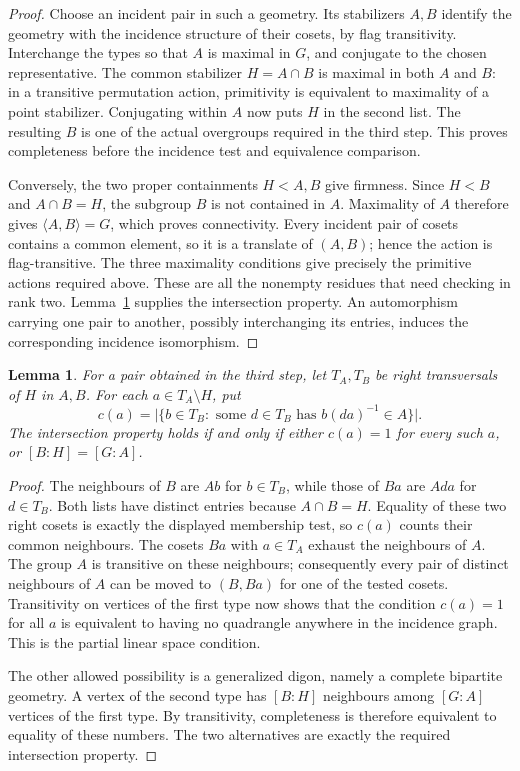 \documentclass[11pt]{article}
\newtheorem{lemma}[theorem]{Lemma}
\begin{document}
\begin{proof}
Choose an incident pair in such a geometry. Its stabilizers $A,B$ identify
the geometry with the incidence structure of their cosets, by flag
transitivity. Interchange the types so that $A$ is maximal in $G$, and
conjugate to the chosen representative. The common stabilizer $H=A\cap B$
is maximal in both $A$ and $B$: in a transitive permutation action,
primitivity is equivalent to maximality of a point stabilizer. Conjugating
within $A$ now puts $H$ in the second list. The resulting $B$ is one of
the actual overgroups required in the third step. This proves completeness
before the incidence test and equivalence comparison.

Conversely, the two proper containments $H<A,B$ give firmness. Since
$H<B$ and $A\cap B=H$, the subgroup $B$ is not contained in $A$.
Maximality of $A$ therefore gives $\langle A,B\rangle=G$, which proves
connectivity. Every incident pair of cosets contains a common element,
so it is a translate of $(A,B)$; hence the action is flag-transitive.
The three maximality conditions give precisely the primitive actions
required above. These are all the nonempty residues that need checking
in rank two. Lemma~\ref{l:allpairs} supplies the intersection property.
An automorphism carrying one pair to another, possibly interchanging
its entries, induces the corresponding incidence isomorphism.
\end{proof}

\begin{lemma}\label{l:allpairs}
For a pair obtained in the third step, let $T_A,T_B$ be right transversals
of $H$ in $A,B$. For each $a\in T_A\setminus H$, put
\[
 c(a)=\bigl|\{b\in T_B:\text{ some }d\in T_B
                              \text{ has }b(da)^{-1}\in A\}\bigr|.
\]
The intersection property holds if and only if either $c(a)=1$ for every
such $a$, or \mbox{$[B:H]=[G:A]$}.
\end{lemma}
\begin{proof}
The neighbours of $B$ are $Ab$ for $b\in T_B$, while those of $Ba$ are
$Ada$ for $d\in T_B$. Both lists have distinct entries because
$A\cap B=H$. Equality of these two right cosets is exactly the displayed
membership test, so $c(a)$ counts their common neighbours. The cosets
$Ba$ with $a\in T_A$ exhaust the neighbours of $A$. The group $A$ is
transitive on these neighbours; consequently every pair of distinct
neighbours of $A$ can be moved to $(B,Ba)$ for one of the tested cosets.
Transitivity on vertices of the first type now shows that the condition
$c(a)=1$ for all $a$ is equivalent to having no quadrangle anywhere in
the incidence graph. This is the partial linear space condition.

The other allowed possibility is a generalized digon, namely a complete
bipartite geometry. A vertex of the second type has $[B:H]$ neighbours
among $[G:A]$ vertices of the first type. By transitivity, completeness
is therefore equivalent to equality of these numbers. The two alternatives
are exactly the required intersection property.
\end{proof}
\end{document}

